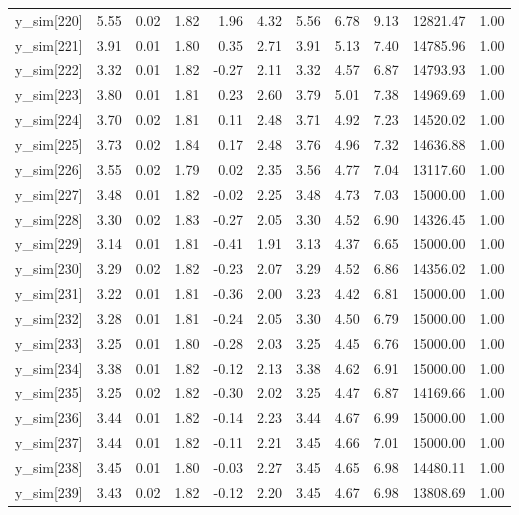\begin{table}[ht]
\begin{tabular}{rrrrrrrrrrr}
  y\_sim[220] & 5.55 & 0.02 & 1.82 & 1.96 & 4.32 & 5.56 & 6.78 & 9.13 & 12821.47 & 1.00 \\ 
  y\_sim[221] & 3.91 & 0.01 & 1.80 & 0.35 & 2.71 & 3.91 & 5.13 & 7.40 & 14785.96 & 1.00 \\ 
  y\_sim[222] & 3.32 & 0.01 & 1.82 & -0.27 & 2.11 & 3.32 & 4.57 & 6.87 & 14793.93 & 1.00 \\ 
  y\_sim[223] & 3.80 & 0.01 & 1.81 & 0.23 & 2.60 & 3.79 & 5.01 & 7.38 & 14969.69 & 1.00 \\ 
  y\_sim[224] & 3.70 & 0.02 & 1.81 & 0.11 & 2.48 & 3.71 & 4.92 & 7.23 & 14520.02 & 1.00 \\ 
  y\_sim[225] & 3.73 & 0.02 & 1.84 & 0.17 & 2.48 & 3.76 & 4.96 & 7.32 & 14636.88 & 1.00 \\ 
  y\_sim[226] & 3.55 & 0.02 & 1.79 & 0.02 & 2.35 & 3.56 & 4.77 & 7.04 & 13117.60 & 1.00 \\ 
  y\_sim[227] & 3.48 & 0.01 & 1.82 & -0.02 & 2.25 & 3.48 & 4.73 & 7.03 & 15000.00 & 1.00 \\ 
  y\_sim[228] & 3.30 & 0.02 & 1.83 & -0.27 & 2.05 & 3.30 & 4.52 & 6.90 & 14326.45 & 1.00 \\ 
  y\_sim[229] & 3.14 & 0.01 & 1.81 & -0.41 & 1.91 & 3.13 & 4.37 & 6.65 & 15000.00 & 1.00 \\ 
  y\_sim[230] & 3.29 & 0.02 & 1.82 & -0.23 & 2.07 & 3.29 & 4.52 & 6.86 & 14356.02 & 1.00 \\ 
  y\_sim[231] & 3.22 & 0.01 & 1.81 & -0.36 & 2.00 & 3.23 & 4.42 & 6.81 & 15000.00 & 1.00 \\ 
  y\_sim[232] & 3.28 & 0.01 & 1.81 & -0.24 & 2.05 & 3.30 & 4.50 & 6.79 & 15000.00 & 1.00 \\ 
  y\_sim[233] & 3.25 & 0.01 & 1.80 & -0.28 & 2.03 & 3.25 & 4.45 & 6.76 & 15000.00 & 1.00 \\ 
  y\_sim[234] & 3.38 & 0.01 & 1.82 & -0.12 & 2.13 & 3.38 & 4.62 & 6.91 & 15000.00 & 1.00 \\ 
  y\_sim[235] & 3.25 & 0.02 & 1.82 & -0.30 & 2.02 & 3.25 & 4.47 & 6.87 & 14169.66 & 1.00 \\ 
  y\_sim[236] & 3.44 & 0.01 & 1.82 & -0.14 & 2.23 & 3.44 & 4.67 & 6.99 & 15000.00 & 1.00 \\ 
  y\_sim[237] & 3.44 & 0.01 & 1.82 & -0.11 & 2.21 & 3.45 & 4.66 & 7.01 & 15000.00 & 1.00 \\ 
  y\_sim[238] & 3.45 & 0.01 & 1.80 & -0.03 & 2.27 & 3.45 & 4.65 & 6.98 & 14480.11 & 1.00 \\ 
  y\_sim[239] & 3.43 & 0.02 & 1.82 & -0.12 & 2.20 & 3.45 & 4.67 & 6.98 & 13808.69 & 1.00 \\ 

\end{tabular}
\end{table}
